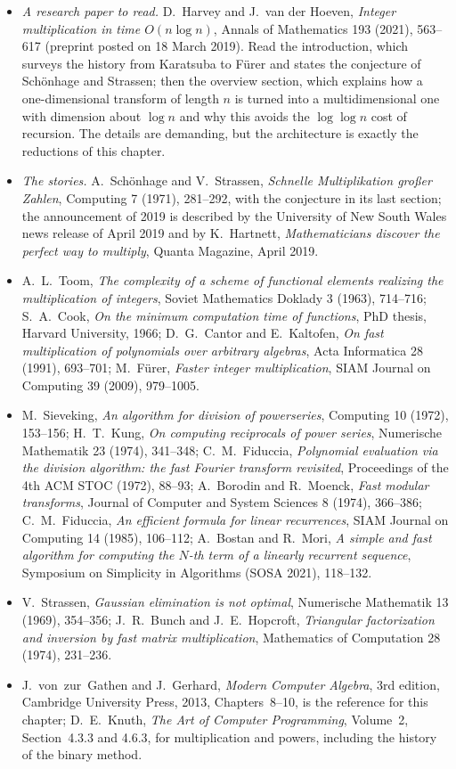 \begin{itemize}
\item \emph{A research paper to read.} D.~Harvey and J.~van der Hoeven, \emph{Integer multiplication in time $O(n\log n)$}, Annals of Mathematics 193 (2021), 563--617 (preprint posted on 18 March 2019). Read the introduction, which surveys the history from Karatsuba to F\"urer and states the conjecture of Sch\"onhage and Strassen; then the overview section, which explains how a one-dimensional transform of length $n$ is turned into a
multidimensional one with dimension about $\log n$ and why this avoids the $\log\log n$ cost of recursion. The details are demanding, but the architecture is exactly the reductions of this chapter.
\item \emph{The stories.} A.~Sch\"onhage and V.~Strassen, \emph{Schnelle Multiplikation gro\ss er Zahlen}, Computing 7 (1971), 281--292, with the conjecture in its last section; the announcement of 2019 is described by the University of New South Wales news release of April 2019 and by K.~Hartnett, \emph{Mathematicians discover the perfect way to multiply}, Quanta Magazine, April 2019.
\item A.~L.~Toom, \emph{The complexity of a scheme of functional elements realizing the multiplication of integers}, Soviet Mathematics Doklady 3 (1963), 714--716; S.~A.~Cook, \emph{On the minimum computation time of functions}, PhD thesis, Harvard University, 1966; D.~G.~Cantor and E.~Kaltofen, \emph{On fast multiplication of polynomials over arbitrary algebras}, Acta Informatica 28 (1991), 693--701; M.~F\"urer, \emph{Faster integer multiplication}, SIAM Journal on Computing 39 (2009), 979--1005.
\item M.~Sieveking, \emph{An algorithm for division of powerseries}, Computing 10 (1972), 153--156; H.~T.~Kung, \emph{On computing reciprocals of power series}, Numerische Mathematik 23 (1974), 341--348; C.~M.~Fiduccia, \emph{Polynomial evaluation via the division algorithm: the fast Fourier transform revisited}, Proceedings of the 4th ACM STOC (1972), 88--93;
A.~Borodin and R.~Moenck, \emph{Fast modular transforms}, Journal of Computer and System Sciences 8 (1974), 366--386; C.~M.~Fiduccia, \emph{An efficient formula for linear recurrences}, SIAM Journal on Computing 14 (1985), 106--112; A.~Bostan and R.~Mori, \emph{A simple and fast algorithm for computing the $N$-th term of a linearly recurrent sequence}, Symposium on Simplicity in Algorithms (SOSA 2021), 118--132.
\item V.~Strassen, \emph{Gaussian elimination is not optimal}, Numerische Mathematik 13 (1969), 354--356; J.~R.~Bunch and J.~E.~Hopcroft, \emph{Triangular factorization and inversion by fast matrix multiplication}, Mathematics of Computation 28 (1974), 231--236.
\item J.~von~zur~Gathen and J.~Gerhard, \emph{Modern Computer Algebra}, 3rd edition, Cambridge University Press, 2013, Chapters~8--10, is the reference for this chapter; D.~E.~Knuth, \emph{The Art of Computer Programming}, Volume~2, Section~4.3.3 and 4.6.3, for multiplication and powers, including the history of the binary method.
\end{itemize}
